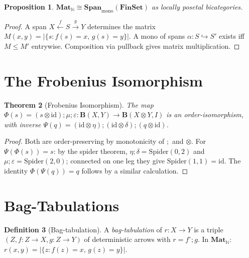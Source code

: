 \documentclass[11pt,a4paper]{article}
\newtheorem{theorem}{Theorem}[section]
\newtheorem{proposition}[theorem]{Proposition}
\theoremstyle{definition}
\newtheorem{definition}[theorem]{Definition}
\newcommand{\op}{{\circ}}
\newcommand{\Span}{\mathbf{Span}}
\newcommand{\Mat}{\mathbf{Mat}}
\newcommand{\FinSet}{\mathbf{FinSet}}
\newcommand{\N}{\mathbb{N}}
\newcommand{\id}{\mathrm{id}}
\begin{document}
\begin{proposition}\label{prop:span-mono}
$\Mat_\N \cong \Span_{\mathrm{mono}}(\FinSet)$ as locally posetal bicategories.
\end{proposition}

\begin{proof}
A span $X \xleftarrow{f} S \xrightarrow{g} Y$ determines the matrix $M(x,y) = |\{s : f(s) = x,\, g(s) = y\}|$. A mono of spans $\alpha \colon S \hookrightarrow S'$ exists iff $M \leq M'$ entrywise. Composition via pullback gives matrix multiplication.
\end{proof}

\section{The Frobenius Isomorphism}
\label{sec:frob-iso}

\begin{theorem}[Frobenius Isomorphism]\label{thm:frob-iso}
The map $\Phi(s) = (s \otimes \id);\mu;\varepsilon \colon \mathbf{B}(X,Y) \to \mathbf{B}(X \otimes Y, I)$ is an order-isomorphism, with inverse $\Psi(q) = (\id \otimes \eta);(\id \otimes \delta);(q \otimes \id)$.
\end{theorem}

\begin{proof}
Both are order-preserving by monotonicity of $;$ and $\otimes$. For $\Psi(\Phi(s)) = s$: by the spider theorem, $\eta;\delta = \mathrm{Spider}(0,2)$ and $\mu;\varepsilon = \mathrm{Spider}(2,0)$; connected on one leg they give $\mathrm{Spider}(1,1) = \id$. The identity $\Phi(\Psi(q)) = q$ follows by a similar calculation.
\end{proof}

\section{Bag-Tabulations}
\label{sec:bag-tab}

\begin{definition}[Bag-tabulation]\label{def:bag-tab}
A \emph{bag-tabulation} of $r \colon X \to Y$ is a triple $(Z, f \colon Z \to X, g \colon Z \to Y)$ of deterministic arrows with $r = f^\op;g$. In $\Mat_\N$: $r(x,y) = |\{z : f(z) = x,\, g(z) = y\}|$.
\end{definition}
\end{document}
